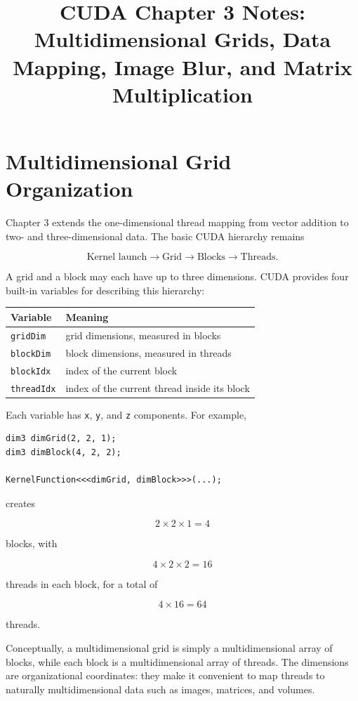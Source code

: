 \documentclass[11pt,a4paper]{article}
\title{CUDA Chapter 3 Notes: Multidimensional Grids, Data Mapping, Image Blur, and Matrix Multiplication}
\author{}
\date{}
\begin{document}
\maketitle

\section{Multidimensional Grid Organization}

Chapter 3 extends the one-dimensional thread mapping from vector addition to two- and three-dimensional data. The basic CUDA hierarchy remains

\[
\text{Kernel launch}
\rightarrow
\text{Grid}
\rightarrow
\text{Blocks}
\rightarrow
\text{Threads}.
\]

A grid and a block may each have up to three dimensions. CUDA provides four built-in variables for describing this hierarchy:

\begin{center}
\begin{tabular}{ll}
\toprule
Variable & Meaning \\
\midrule
\texttt{gridDim} & grid dimensions, measured in blocks \\
\texttt{blockDim} & block dimensions, measured in threads \\
\texttt{blockIdx} & index of the current block \\
\texttt{threadIdx} & index of the current thread inside its block \\
\bottomrule
\end{tabular}
\end{center}

Each variable has \texttt{x}, \texttt{y}, and \texttt{z} components. For example,

\begin{lstlisting}
dim3 dimGrid(2, 2, 1);
dim3 dimBlock(4, 2, 2);

KernelFunction<<<dimGrid, dimBlock>>>(...);
\end{lstlisting}

creates

\[
2\times2\times1=4
\]

blocks, with

\[
4\times2\times2=16
\]

threads in each block, for a total of

\[
4\times16=64
\]

threads.

Conceptually, a multidimensional grid is simply a multidimensional array of blocks, while each block is a multidimensional array of threads. The dimensions are organizational coordinates: they make it convenient to map threads to naturally multidimensional data such as images, matrices, and volumes.
\end{document}
